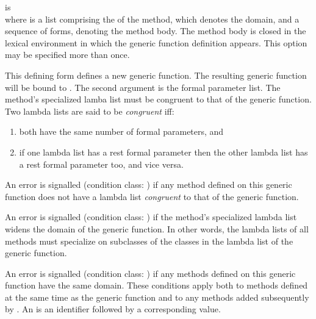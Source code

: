 \begin{optDefinition}
\begin{arguments}
    \item[\scref{level-0-init-option}] is 
     \\
    where  is a list comprising the
     of the method, which denotes the domain, and
    a sequence of forms, denoting the method body.  The method body is closed in
    the lexical environment in which the generic function definition
    appears. This option may be specified more than once.
\end{arguments}
%
\remarks%
This defining form defines a new generic function.  The resulting
generic function will be bound to .  The second argument
is the formal parameter list.  The method's specialized lamba list
must be congruent to that of the generic function.  Two lambda lists
are said to be {\em congruent\/} iff:
%
\begin{enumerate}
    \item  both have the same number of formal parameters, and
    \item  if one lambda list has a rest formal parameter then the other
    lambda list has a rest formal parameter too, and vice versa.
\end{enumerate}
%
An error is signalled (condition class:
) if any method defined on this
generic function does not have a lambda list {\em congruent\/} to that of the
generic function.

An error is signalled (condition class:
) if the method's specialized lambda
list widens the domain of the generic function.  In other words, the lambda
lists of all methods must specialize on subclasses of the classes in the lambda
list of the generic function.

An error is signalled (condition class: 
) if any methods defined on this generic
function have the same domain.  These conditions apply both to methods defined
at the same time as the generic function and to any methods added subsequently
by .  An  is an identifier
followed by a corresponding value.


\end{optDefinition}
